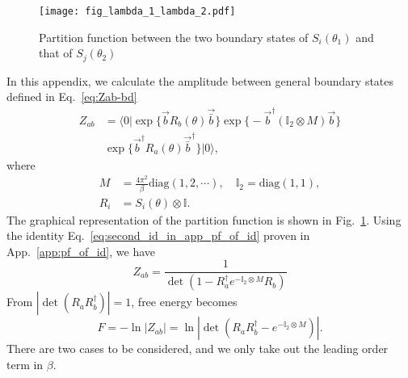 
\begin{figure}[h]
\centering
\texttt{[image: fig\_lambda\_1\_lambda\_2.pdf]}
\caption{Partition function between the two boundary states of $S_i( \theta_1)$ and that of $S_j( \theta_2 )$}
\label{fig:fig_lambda_1_lambda_2}
\end{figure}

In this appendix, we calculate the amplitude between general boundary states defined in Eq.~\eqref{eq:Zab-bd}
\begin{equation}
\begin{aligned}
Z_{ab} &= \langle 0 | \exp\Big\{  \vec{b} R_b( \theta )    \vec{\bar{b}} \Big\}  \exp\Big\{ -\vec{b}^{\dagger}  (\mathbb{I}_2  \otimes M)  \vec{b} \Big\} \\
&\exp\Big\{  \vec{b}^{\dagger} R_a( \theta )    \vec{\bar{b}}^{\dagger} \Big\} | 0\rangle,
\end{aligned}
\end{equation}
where
\begin{equation}
\begin{aligned}
M &=  \frac{4\pi^2}{\beta} \text{diag}( 1, 2, \cdots ), \quad  \mathbb{I}_2 = \text{diag}( 1, 1), \\
R_i &= S_i( \theta ) \otimes \mathbb{I}.
\end{aligned}
\end{equation}
The graphical representation of the partition function is shown in Fig.~\ref{fig:fig_lambda_1_lambda_2}. Using the identity Eq.~\eqref{eq:second_id_in_app_pf_of_id} proven in App.~\ref{app:pf_of_id}, we have
\begin{equation}
Z_{ab} = \frac{1}{\det(1 - R_a^{\dagger} e^{- \mathbb{I}_2 \otimes M} R_b )}
\end{equation}
From $|\det( R_a R_b^{\dagger})|  = 1$, free energy becomes
\begin{equation}
F = - \ln |Z_{ab}| = \ln |\det ( R_a R_b^{\dagger} - e^{- \mathbb{I}_2 \otimes M} )| .
\end{equation}
There are two cases to be considered, and we only take out the leading order term in $\beta$. 

